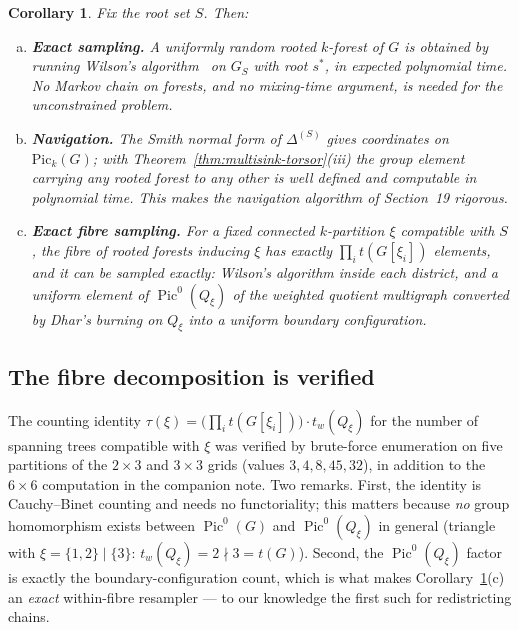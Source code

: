 \documentclass[11pt]{article}
\newcommand{\Pic}{\operatorname{Pic}^0}
\newtheorem{corollary}{Corollary}
\begin{document}
\begin{corollary}
\label{cor:algorithms}
Fix the root set $S$. Then:
\begin{enumerate}[(a)]
  \item \textbf{Exact sampling.} A uniformly random rooted $k$-forest of $G$
    is obtained by running Wilson's algorithm~\cite{wilson1996generating} on
    $G_S$ with root $s^*$, in expected polynomial time. No Markov chain on
    forests, and no mixing-time argument, is needed for the unconstrained
    problem.
  \item \textbf{Navigation.} The Smith normal form of $\Delta^{(S)}$ gives
    coordinates on $\mathrm{Pic}_k(G)$; with
    Theorem~\ref{thm:multisink-torsor}(iii) the group element carrying any
    rooted forest to any other is well defined and computable in polynomial
    time. This makes the navigation algorithm of Section~19 rigorous.
  \item \textbf{Exact fibre sampling.} For a fixed connected $k$-partition
    $\xi$ compatible with $S$, the fibre of rooted forests inducing $\xi$ has
    exactly $\prod_i t(G[\xi_i])$ elements, and it can be sampled exactly:
    Wilson's algorithm inside each district, and a uniform element of
    $\Pic(Q_\xi)$ of the weighted quotient multigraph converted by Dhar's
    burning on $Q_\xi$ into a uniform boundary configuration.
\end{enumerate}
\end{corollary}

\subsection{The fibre decomposition is verified}

The counting identity
$\tau(\xi) = \bigl(\prod_i t(G[\xi_i])\bigr) \cdot t_w(Q_\xi)$ for the number
of spanning trees compatible with $\xi$ was verified by brute-force
enumeration on five partitions of the $2 \times 3$ and $3 \times 3$ grids
(values $3, 4, 8, 45, 32$), in addition to the $6 \times 6$ computation in the
companion note. Two remarks. First, the identity is Cauchy--Binet counting and
needs no functoriality; this matters because \emph{no} group homomorphism
exists between $\Pic(G)$ and $\Pic(Q_\xi)$ in general (triangle with
$\xi = \{1,2\} \mid \{3\}$: $t_w(Q_\xi) = 2 \nmid 3 = t(G)$). Second, the
$\Pic(Q_\xi)$ factor is exactly the boundary-configuration count, which is what
makes Corollary~\ref{cor:algorithms}(c) an \emph{exact} within-fibre
resampler --- to our knowledge the first such for redistricting chains.
\end{document}
